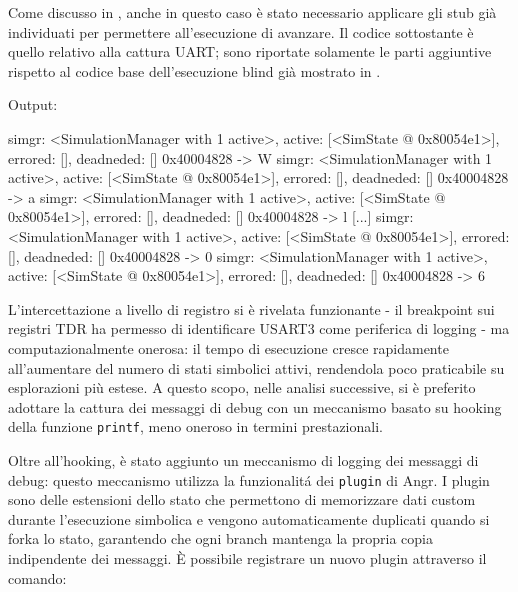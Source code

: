 Come discusso in , anche in questo caso 
è stato necessario applicare gli stub già individuati per permettere 
all'esecuzione di avanzare.
\newline
Il codice sottostante è quello relativo alla cattura UART; sono 
riportate solamente le parti aggiuntive rispetto al codice base 
dell'esecuzione blind già mostrato in .



Output:

\begin{bashcode}
simgr: <SimulationManager with 1 active>, active: [<SimState @ 0x80054e1>], errored: [], deadneded: [] 0x40004828 -> W
simgr: <SimulationManager with 1 active>, active: [<SimState @ 0x80054e1>], errored: [], deadneded: [] 0x40004828 -> a
simgr: <SimulationManager with 1 active>, active: [<SimState @ 0x80054e1>], errored: [], deadneded: [] 0x40004828 -> l
[...]
simgr: <SimulationManager with 1 active>, active: [<SimState @ 0x80054e1>], errored: [], deadneded: [] 0x40004828 -> 0
simgr: <SimulationManager with 1 active>, active: [<SimState @ 0x80054e1>], errored: [], deadneded: [] 0x40004828 -> 6
\end{bashcode}

L'intercettazione a livello di registro si è rivelata funzionante - il 
breakpoint sui registri TDR ha permesso di identificare USART3 come 
periferica di logging - ma computazionalmente onerosa: il tempo di 
esecuzione cresce rapidamente all'aumentare del numero di stati simbolici 
attivi, rendendola poco praticabile su esplorazioni più estese. A questo 
scopo, nelle analisi successive, si è preferito adottare la cattura dei 
messaggi di debug con un meccanismo basato su hooking della funzione 
\texttt{printf}, meno oneroso in termini prestazionali.

Oltre all'hooking, è stato aggiunto un meccanismo di logging dei messaggi 
di debug: questo meccanismo utilizza la funzionalitá dei \texttt{plugin} di 
Angr. I plugin sono delle estensioni dello stato che permettono di 
memorizzare dati custom durante l'esecuzione simbolica e vengono 
automaticamente duplicati quando si forka lo stato, garantendo che ogni 
branch mantenga la propria copia indipendente dei messaggi.
È possibile registrare un nuovo plugin attraverso il comando:

